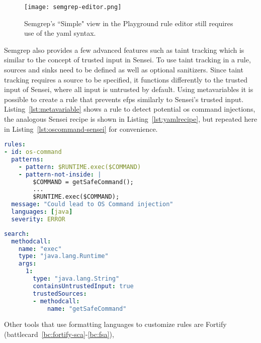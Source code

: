 \begin{sidewaysfigure}
  \centering
  \texttt{[image: semgrep-editor.png]}
  \caption[Semgrep playground editor]{Semgrep's ``Simple" view in the Playground rule editor still requires use of the \gls{yaml} syntax.}
  \label{fig:semgrep-editor} 
\end{sidewaysfigure}

Semgrep also provides a few advanced features such as taint tracking which is similar to the concept of trusted input in Sensei.
To use taint tracking in a rule, sources and sinks need to be defined as well as optional sanitizers.
Since taint tracking requires a source to be specified, it functions differently to the trusted input of Sensei, where all input is untrusted by default.
Using metavariables it is possible to create a rule that prevents \glspl{efp} similarly to Sensei's trusted input. 
Listing~\ref{lst:metavariable} shows a rule to detect potential \gls{os} command injections, the analogous Sensei recipe is shown in Listing~\ref{lst:yamlrecipe}, but repeated here in Listing~\ref{lst:oscommand-sensei} for convenience.

\begin{minipage}[t]{0.9\linewidth}
\begin{lstlisting}[language={yaml},caption={Any commands passed on to the \texttt{exec} method that have not been retrieved through \texttt{getSafeCommand} will be marked.},label={lst:metavariable},xleftmargin=15pt]
rules:
- id: os-command
  patterns:
    - pattern: $RUNTIME.exec($COMMAND)
    - pattern-not-inside: |
        $COMMAND = getSafeCommand();
        ...
        $RUNTIME.exec($COMMAND);
  message: "Could lead to OS Command injection"
  languages: [java]
  severity: ERROR

\end{lstlisting}

\begin{lstlisting}[language={yaml},caption={Any input is untrusted by default except input retrieved through \texttt{getSafeCommand}. Untrusted input passed on to the \texttt{exec} methodcall will be marked.},label={lst:oscommand-sensei},xleftmargin=15pt]
search:
  methodcall:
    name: "exec"
    type: "java.lang.Runtime"
    args:
      1:
        type: "java.lang.String"
        containsUntrustedInput: true
        trustedSources:
        - methodcall:
            name: "getSafeCommand"
\end{lstlisting}
\end{minipage}

Other tools that use formatting languages to customize rules are Fortify (battlecard~\ref{bc:fortify-sca}-\ref{bc:fsa}), 
